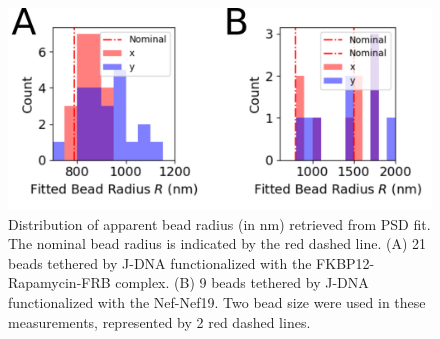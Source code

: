 \documentclass{biophys-new}
\begin{document}
\begin{figure}[hbt!]
	\centering
	\includegraphics[width=0.6\linewidth]{Figures/fig_Radius.png}
	\caption{Distribution of apparent bead radius (in nm) retrieved from PSD fit. The nominal bead radius is indicated by the red dashed line. (A) 21 beads tethered by J-DNA functionalized with the FKBP12-Rapamycin-FRB complex. (B) 9 beads tethered by J-DNA functionalized with the Nef-Nef19. Two bead size were used in these measurements, represented by 2 red dashed lines.}
	\label{fig:Rdiffusion}
\end{figure}



%


\end{document}
